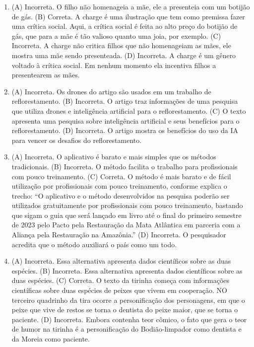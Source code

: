 \begin{enumerate}
\item (A) Incorreta. O filho não homenageia a mãe, ele a presenteia com um
botijão de gás.
(B) Correta. A charge é uma ilustração que tem como premissa fazer uma
crítica social. Aqui, a crítica social é feita ao alto preço do botijão
de gás, que para a mãe é tão valioso quanto uma joia, por exemplo.
(C) Incorreta. A charge não critica filhos que não homenageiam as mães,
ele mostra uma mãe sendo presenteada.
(D) Incorreta. A charge é um gênero voltado à crítica social. Em nenhum
momento ela incentiva filhos a presentearem as mães.

\item (A) Incorreta. Os drones do artigo são usados em um trabalho de
reflorestamento.
(B) Incorreta. O artigo traz informações de uma pesquisa que utiliza
drones e inteligência artificial para o reflorestamento.
(C) O texto apresenta uma pesquisa sobre inteligência artificial e seus
benefícios para o reflorestamento.
(D) Incorreta. O artigo mostra os benefícios do uso da IA para vencer os
desafios do reflorestamento.

\item (A) Incorreta. O aplicativo é barato e mais simples que os métodos
tradicionais.
(B) Incorreta. O método facilita o trabalho para profissionais com pouco
treinamento.
(C) Correta. O método é mais barato e de fácil utilização por
profissionais com pouco treinamento, conforme explica o trecho: ``O
aplicativo e o método desenvolvidos na pesquisa poderão ser utilizados
gratuitamente por profissionais com pouco treinamento, bastando que
sigam o guia que será lançado em livro até o final do primeiro semestre
de 2023 pelo Pacto pela Restauração da Mata Atlântica em parceria com a
Aliança pela Restauração na Amazônia.''
(D)
  Incorreta. O pesquisador acredita que o método auxiliará o país como
  um todo.

\item (A) Incorreta. Essa alternativa apresenta dados científicos sobre as duas
espécies.
(B) Incorreta. Essa alternativa apresenta dados científicos sobre as duas
espécies.
(C) Correta. O texto da tirinha começa com informações científicas sobre
duas espécies de peixes que vivem em cooperação. NO terceiro quadrinho
da tira ocorre a personificação dos personagens, em que o peixe que vive
de restos se torna o dentista do peixe maior, que se torna o paciente.
(D) Incorreta. Embora contenha teor cômico, o fato que gera o teor de
humor na tirinha é a personificação do Bodião-limpador como dentista e
da Moreia como paciente.


\end{enumerate}
